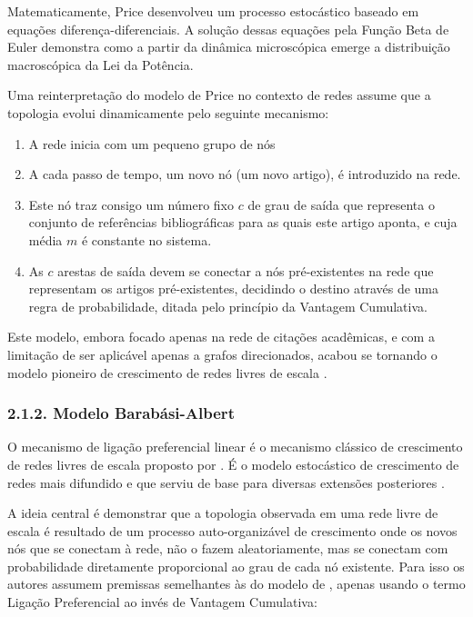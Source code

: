 \documentclass[12pt,oneside,a4paper,brazil,sumario=tradicional]{abntex2}
\begin{document}
Matematicamente, Price desenvolveu um processo estocástico baseado em equações diferença-diferenciais. A solução dessas equações pela Função Beta de Euler demonstra como a partir da dinâmica microscópica emerge a distribuição macroscópica da Lei da Potência.

Uma reinterpretação do modelo de Price no contexto de redes assume que a topologia evolui dinamicamente pelo seguinte mecanismo:

\begin{enumerate}
  \item A rede inicia com um pequeno grupo de nós
  \item A cada passo de tempo, um novo nó (um novo artigo), é introduzido na rede.
  \item Este nó traz consigo um número fixo $c$ de grau de saída que representa o conjunto de referências bibliográficas para as quais este artigo aponta, e cuja média $m$ é constante no sistema.
  \item As $c$ arestas de saída devem se conectar a nós pré-existentes na rede que representam os artigos pré-existentes, decidindo o destino através de uma regra de probabilidade, ditada pelo princípio da Vantagem Cumulativa.
\end{enumerate}

Este modelo, embora focado apenas na rede de citações acadêmicas, e com a limitação de ser aplicável apenas a grafos direcionados, acabou se tornando o modelo pioneiro de crescimento de redes livres de escala \parencite{newman2010}.

\subsubsection*{2.1.2. Modelo Barabási-Albert}
O mecanismo de ligação preferencial linear é o mecanismo clássico de crescimento de redes livres de escala proposto por \textcite{barabasi1999}. É o modelo estocástico de crescimento de redes mais difundido e que serviu de base para diversas extensões posteriores \parencite{albert2000, amaral2000, bianconi2001, holme2002, dorogovtsvev2000}.

A ideia central é demonstrar que a topologia observada em uma rede livre de escala é resultado de um processo auto-organizável de crescimento onde os novos nós que se conectam à rede, não o fazem aleatoriamente, mas se conectam com probabilidade diretamente proporcional ao grau de cada nó existente. Para isso os autores assumem premissas semelhantes às do modelo de \textcite{price1976}, apenas usando o termo Ligação Preferencial ao invés de Vantagem Cumulativa:
\end{document}

